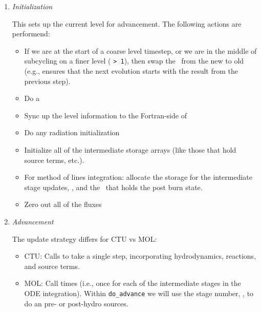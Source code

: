 \begin{enumerate}
\item {\em Initialization} 

  This sets up the current level for advancement.  The following actions
  are performend:
  \begin{itemize}
  \item If we are at the start of a coarse level timestep, or we are
    in the middle of subcycling on a finer level
    ( {\tt > 1}), then swap the \statedata\ from
    the new to old (e.g., ensures that the next evolution starts with
    the result from the previous step).

  \item Do a 

  \item Sync up the level information to the Fortran-side of \castro

  \item Do any radiation initialization

  \item Initialize all of the intermediate storage arrays (like those
    that hold source terms, etc.).

  \item For method of lines integration: allocate the storage for the 
    intermediate stage updates, , and the  \multifab\
    that holds the post burn state.

  \item Zero out all of the fluxes

  \end{itemize}

      

\item {\em Advancement} 

  The update strategy differs for CTU vs MOL:
  \begin{itemize}
  \item CTU: Calls  to take a single step,
    incorporating hydrodynamics, reactions, and source terms.

  \item MOL: Call   times
    (i.e., once for each of the intermediate stages in the ODE
    integration).  Within {\tt do\_advance} we will use the stage
    number, \variable{mol\_iteration}, to do an pre- or post-hydro
    sources.

  \end{itemize}


\end{enumerate}
